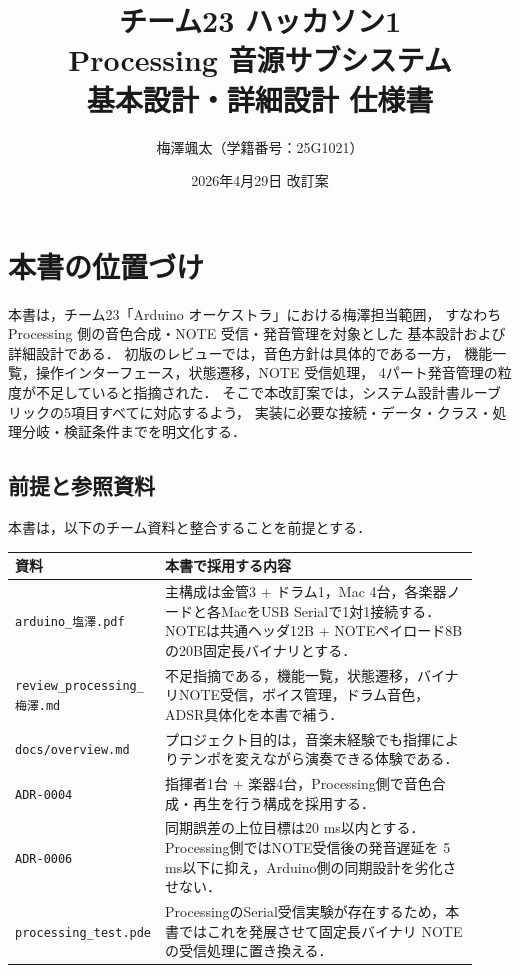 \documentclass[a4paper,11pt]{jsarticle}
\title{チーム23 ハッカソン1\\
Processing 音源サブシステム\\
基本設計・詳細設計 仕様書}
\author{梅澤颯太（学籍番号：25G1021）}
\date{2026年4月29日 改訂案}
\begin{document}
\maketitle
\tableofcontents
\newpage

\section{本書の位置づけ}

本書は，チーム23「Arduino オーケストラ」における梅澤担当範囲，
すなわち Processing 側の音色合成・NOTE 受信・発音管理を対象とした
基本設計および詳細設計である．
初版のレビューでは，音色方針は具体的である一方，
機能一覧，操作インターフェース，状態遷移，NOTE 受信処理，
4パート発音管理の粒度が不足していると指摘された．
そこで本改訂案では，システム設計書ルーブリックの5項目すべてに対応するよう，
実装に必要な接続・データ・クラス・処理分岐・検証条件までを明文化する．

\subsection{前提と参照資料}

本書は，以下のチーム資料と整合することを前提とする．

\begin{longtable}{>{\raggedright\arraybackslash}p{0.24\linewidth}p{0.68\linewidth}}
\toprule
資料 & 本書で採用する内容 \\
\midrule
\endhead
\texttt{arduino\_塩澤.pdf} &
主構成は金管3 + ドラム1，Mac 4台，各楽器ノードと各MacをUSB Serialで1対1接続する．
NOTEは共通ヘッダ12B + NOTEペイロード8Bの20B固定長バイナリとする． \\
\texttt{review\_processing\_梅澤.md} &
不足指摘である，機能一覧，状態遷移，バイナリNOTE受信，ボイス管理，ドラム音色，
ADSR具体化を本書で補う． \\
\texttt{docs/overview.md} &
プロジェクト目的は，音楽未経験でも指揮によりテンポを変えながら演奏できる体験である． \\
\texttt{ADR-0004} &
指揮者1台 + 楽器4台，Processing側で音色合成・再生を行う構成を採用する． \\
\texttt{ADR-0006} &
同期誤差の上位目標は20 ms以内とする．Processing側ではNOTE受信後の発音遅延を
5 ms以下に抑え，Arduino側の同期設計を劣化させない． \\
\texttt{processing\_test.pde} &
ProcessingのSerial受信実験が存在するため，本書ではこれを発展させて固定長バイナリ
NOTEの受信処理に置き換える． \\
\bottomrule
\end{longtable}
\end{document}
